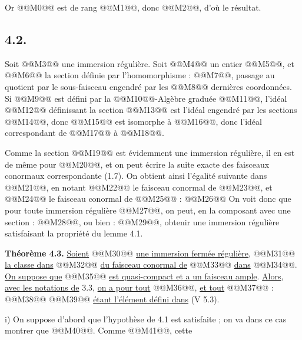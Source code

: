 
Or @@M0@@ est de
rang @@M1@@, donc @@M2@@, d'où le résultat.

\subsection*{4.2.}

Soit @@M3@@ une immersion régulière. Soit @@M4@@ un entier @@M5@@, et @@M6@@ la section définie par l'homomorphisme : @@M7@@, passage au quotient par le sous-faisceau engendré par les @@M8@@ dernières coordonnées. Si @@M9@@ est défini par la @@M10@@-Algèbre graduée @@M11@@, l'idéal @@M12@@ définissant la section @@M13@@ est l'idéal engendré par les sections @@M14@@, donc @@M15@@ est isomorphe à @@M16@@, donc l'idéal correspondant de @@M17@@ à @@M18@@.

Comme la section @@M19@@ est évidemment une immersion régulière, il en est de même pour @@M20@@, et on peut écrire la suite exacte des faisceaux conormaux correspondante (1.7). On obtient ainsi l'égalité suivante dans @@M21@@, en notant @@M22@@ le faisceau conormal de @@M23@@, et @@M24@@ le faisceau conormal de @@M25@@ :
@@M26@@
On voit donc que pour toute immersion régulière @@M27@@, on peut, en la composant avec une section : @@M28@@, ou bien : @@M29@@, obtenir une immersion régulière satisfaisant la propriété du lemme 4.1.

\textbf{Théorème 4.3.} \uline{Soient} @@M30@@ \uline{une immersion fermée régulière}, @@M31@@ \uline{la classe dans} @@M32@@ \uline{du faisceau conormal de} @@M33@@ \uline{dans} @@M34@@. \uline{On suppose que} @@M35@@ \uline{est quasi-compact et a un faisceau ample}. \uline{Alors}, \uline{avec les notations de} 3.3, \uline{on a pour tout} @@M36@@, \uline{et tout} @@M37@@ :
@@M38@@
@@M39@@ \uline{étant l'élément défini dans} (V 5.3).

i) On suppose d'abord que l'hypothèse de 4.1 est satisfaite ; on va dans ce cas montrer que @@M40@@. Comme @@M41@@, cette
